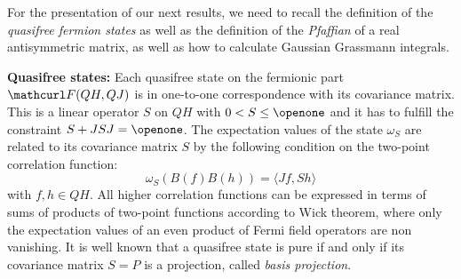 \documentclass[pra,twoside,amsmath,amsfonts,amssymb,superscriptaddress,showpacs]{revtex4}
\def\9#1{{\mathcurl #1}}
\def\I{\openone}
\newcommand{\CAR}[2]{\9F(#1,#2)}
\newcommand{\SPROD}[2]{\langle{#1},{#2}\rangle}
\begin{document}
For the presentation of our next results, we need to recall the definition of the {\em
quasifree fermion states} as well as the definition of the {\em Pfaffian} of a real antisymmetric
matrix, as well as how to calculate Gaussian Grassmann integrals.

\vspace{2em}

\noindent
{\bf Quasifree states:} 
Each quasifree state on the fermionic part $\CAR{QH}{QJ}$ is in one-to-one
correspondence with its covariance matrix. This is a linear operator
$S$ on $QH$ with $0<S\leq \I$ and it has to fulfill the constraint $S+JSJ=\I$.
The expectation values of the state $\omega_S$ are related to its
covariance matrix $S$ by the following condition on the two-point correlation
function:
\begin{equation}\label{eq:twopoint}
\omega_S( B(f) B(h))=\SPROD{J f}{Sh}
\end{equation}
with $f,h\in QH$.
All higher correlation functions can be expressed in terms of sums of products
of two-point functions according to Wick theorem, where only the expectation values of an even
product of Fermi field operators are non vanishing. It is well
known that a quasifree state is pure if and only if its covariance matrix $S=P$ is a projection,
called {\em basis projection}.

\vspace{2em}
\end{document}
